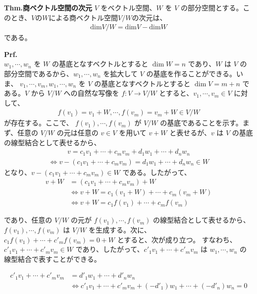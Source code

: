 \documentclass[a4paper,11pt]{jsarticle}
\numberwithin{equation}{section}
\begin{document}
\begin{itembox}[l]{\textbf{Thm.商ベクトル空間の次元}}
  $V$ をベクトル空間、$W$ を $V$ の部分空間とする。このとき、$V$の$W$による商ベクトル空間$V/W$の次元は、
  \begin{align}
      \text{dim} V/W = \text{dim} V - \text{dim} W
  \end{align}
  である。
\end{itembox}
\textbf{Prf.}\\
$w_1, \cdots, w_n$ を $W$ の基底となすベクトルとすると $\dim W = n$ であり、$W$ は $V$ の部分空間であるから、$w_1, \cdots, w_n$ を拡大して $V$ の基底を作ることができる。いま、
$v_1, \cdots, v_m, w_1, \cdots, w_n$ を $V$ の基底となすベクトルとすると $\dim V = m + n$ である。$V$ から $V / W$ への自然な写像を $f : V \rightarrow V / W$ とすると、$v_1, \cdots, v_m \in V$ に対して、
\begin{align}
f(v_1) = v_1 + W, \cdots, f(v_m) = v_m + W \in V / W
\end{align}
が存在する。ここで、
$f(v_1), \cdots, f(v_m)$ が $V / W$ の基底であることを示す。まず、任意の $V / W$ の元は任意の $v \in V$ を用いて $v + W$ と表せるが、$v$ は $V$ の基底の線型結合として表せるから、
\begin{align}
v = c_1 v_1 + \cdots + c_m v_m + d_1 w_1 + \cdots + d_n w_n
\end{align}
\begin{align}
\iff v - (c_1 v_1 + \cdots + c_m v_m) = d_1 w_1 + \cdots + d_n w_n \in W
\end{align}
となり、$v - (c_1 v_1 + \cdots + c_m v_m) \in W$ である。したがって、
\begin{align}
v + W &= (c_1 v_1 + \cdots + c_m v_m) + W \\
&\iff v + W = c_1 (v_1 + W) + \cdots + c_m (v_m + W) \\
&\iff v + W = c_1 f(v_1) + \cdots + c_m f(v_m)
\end{align}

であり、任意の $V / W$ の元が $f(v_1), \cdots , f(v_m)$ の線型結合として表せるから、$f(v_1), \cdots , f(v_m)$ は $V / W$ を生成する。次に、$c_1 f(v_1) + \cdots + c'_m f(v_m) = 0 + W$ とすると、次が成り立つ。
すなわち、$c'_1 v_1 + \cdots + c'_m v_m \in W$ であり、したがって、$c'_1 v_1 + \cdots + c'_m v_m$ は $w_1, \cdots, w_n$ の線型結合で表すことができる。

\begin{align}
c'_1 v_1 + \cdots + c'_m v_m &= d'_1 w_1 + \cdots + d'_n w_n \\
&\iff c'_1 v_1 + \cdots + c'_m v_m + (-d'_1) w_1 + \cdots + (-d'_n) w_n = 0
\end{align}
\end{document}

